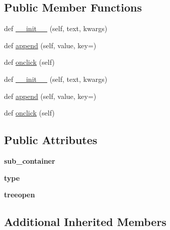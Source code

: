 \subsection*{Public Member Functions}
\begin{DoxyCompactItemize}
\item 
def \hyperlink{classremi_1_1gui_1_1TreeItem_aaaa1d3658774ed317a39ef970e6fe489}{\+\_\+\+\_\+init\+\_\+\+\_\+} (self, text, kwargs)
\item 
def \hyperlink{classremi_1_1gui_1_1TreeItem_a9246ea5f969f164899238990ecaa95ee}{append} (self, value, key=\textquotesingle{}\textquotesingle{})
\item 
def \hyperlink{classremi_1_1gui_1_1TreeItem_a8f76678fa71754a4f2f655beb89283b7}{onclick} (self)
\item 
def \hyperlink{classremi_1_1gui_1_1TreeItem_aaaa1d3658774ed317a39ef970e6fe489}{\+\_\+\+\_\+init\+\_\+\+\_\+} (self, text, kwargs)
\item 
def \hyperlink{classremi_1_1gui_1_1TreeItem_a9246ea5f969f164899238990ecaa95ee}{append} (self, value, key=\textquotesingle{}\textquotesingle{})
\item 
def \hyperlink{classremi_1_1gui_1_1TreeItem_a8f76678fa71754a4f2f655beb89283b7}{onclick} (self)
\end{DoxyCompactItemize}
\subsection*{Public Attributes}
\begin{DoxyCompactItemize}
\item 
{\bfseries sub\+\_\+container}\hypertarget{classremi_1_1gui_1_1TreeItem_acaab7326ae6649ad3e12ce47e83b828f}{}\label{classremi_1_1gui_1_1TreeItem_acaab7326ae6649ad3e12ce47e83b828f}

\item 
{\bfseries type}\hypertarget{classremi_1_1gui_1_1TreeItem_a04cf31b307996b5bb5d356175b715a8d}{}\label{classremi_1_1gui_1_1TreeItem_a04cf31b307996b5bb5d356175b715a8d}

\item 
{\bfseries treeopen}\hypertarget{classremi_1_1gui_1_1TreeItem_a3dec560a24a7f131d5a4ecec23e26cce}{}\label{classremi_1_1gui_1_1TreeItem_a3dec560a24a7f131d5a4ecec23e26cce}

\end{DoxyCompactItemize}
\subsection*{Additional Inherited Members}


